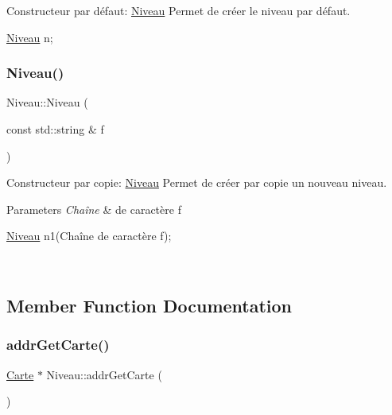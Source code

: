 Constructeur par défaut\+: \hyperlink{classNiveau}{Niveau} Permet de créer le niveau par défaut. 


\begin{DoxyCode}
\hyperlink{classNiveau}{Niveau} n;
\end{DoxyCode}
 \mbox{\label{classNiveau_a5f59a46da066f15b0c21154cbf583490}} 
\subsubsection{\texorpdfstring{Niveau()}{Niveau()}\hspace{0.1cm}{\footnotesize\ttfamily [2/2]}}
{\footnotesize\ttfamily Niveau\+::\+Niveau (\begin{DoxyParamCaption}\item[{const std\+::string \&}]{f }\end{DoxyParamCaption})}



Constructeur par copie\+: \hyperlink{classNiveau}{Niveau} Permet de créer par copie un nouveau niveau. 


\begin{DoxyParams}{Parameters}
{\em Chaîne} & de caractère f 
\begin{DoxyCode}
\hyperlink{classNiveau}{Niveau} n1(Chaîne de caractère f);
\end{DoxyCode}
 \\
\hline
\end{DoxyParams}


\subsection{Member Function Documentation}
\mbox{\label{classNiveau_a47ea8b8f36e27be8ad0d3f534a956260}} 
\subsubsection{\texorpdfstring{addr\+Get\+Carte()}{addrGetCarte()}}
{\footnotesize\ttfamily \hyperlink{classCarte}{Carte} $\ast$ Niveau\+::addr\+Get\+Carte (\begin{DoxyParamCaption}{ }\end{DoxyParamCaption})}




